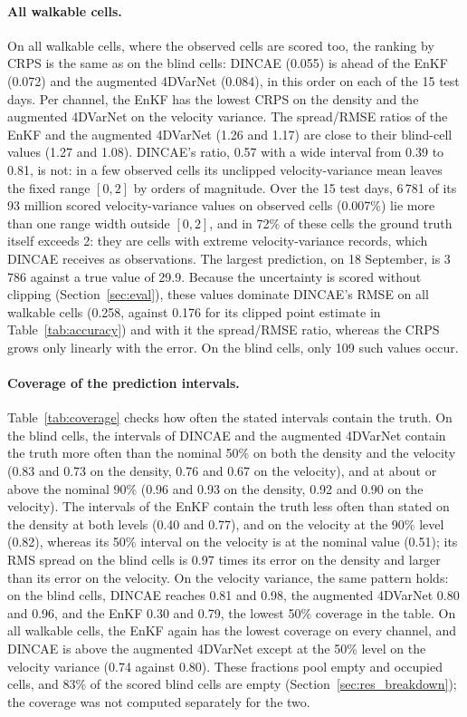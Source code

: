 \documentclass[english, 12pt, a4paper, elec, utf8, a-2b, online]{aaltothesis}
\begin{document}
\paragraph{All walkable cells.}
On all walkable cells, where the observed cells are scored too, the ranking by
CRPS is the same as on the blind cells: DINCAE (0.055) is ahead of the EnKF
(0.072) and the augmented 4DVarNet (0.084), in this order on each of the 15
test days. Per channel, the EnKF has the lowest CRPS on the density and the
augmented 4DVarNet on the velocity variance. The spread/RMSE ratios of the EnKF
and the augmented 4DVarNet (1.26 and 1.17) are close to their blind-cell values
(1.27 and 1.08). DINCAE's ratio, 0.57 with a wide interval from 0.39 to 0.81,
is not: in a few observed cells its unclipped velocity-variance mean leaves the
fixed range $[0, 2]$ by orders of magnitude. Over the 15 test days, 6\,781 of its 93
million scored velocity-variance values on observed cells (0.007\%) lie more
than one range width outside $[0, 2]$, and in 72\% of these cells the ground
truth itself exceeds 2: they are cells with extreme velocity-variance records,
which DINCAE receives as observations. The largest prediction, on 18 September,
is 3\,786 against a true value of 29.9. Because the uncertainty is scored without
clipping (Section~\ref{sec:eval}), these values dominate DINCAE's RMSE on all
walkable cells (0.258, against 0.176 for its clipped point estimate in
Table~\ref{tab:accuracy}) and with it the spread/RMSE ratio, whereas the CRPS
grows only linearly with the error. On the blind
cells, only 109 such values occur.

\paragraph{Coverage of the prediction intervals.}
Table~\ref{tab:coverage} checks how often the stated intervals contain the
truth. On the blind cells, the intervals of DINCAE and the augmented 4DVarNet
contain the truth more often than the nominal 50\% on both the density and the
velocity (0.83 and 0.73 on the density, 0.76 and 0.67 on the velocity), and at about or
above the nominal 90\% (0.96 and 0.93 on the density, 0.92 and 0.90 on the velocity). The
intervals of the EnKF contain the truth less often than stated on the density
at both levels (0.40 and 0.77), and on the velocity at the 90\% level (0.82),
whereas its 50\% interval on the velocity is at the nominal value (0.51); its
RMS spread on the blind cells is 0.97 times its error on the density and larger
than its error on the velocity. On the velocity variance, the same pattern
holds: on the blind cells, DINCAE reaches 0.81 and 0.98, the augmented 4DVarNet
0.80 and 0.96, and the EnKF 0.30 and 0.79, the lowest 50\% coverage in
the table. On all walkable cells, the EnKF again has the lowest coverage on
every channel, and DINCAE is above the augmented 4DVarNet except at the 50\%
level on the velocity variance (0.74 against 0.80).
These fractions pool empty and occupied cells, and 83\% of the scored blind
cells are empty (Section~\ref{sec:res_breakdown}); the coverage was not computed
separately for the two.
\end{document}
